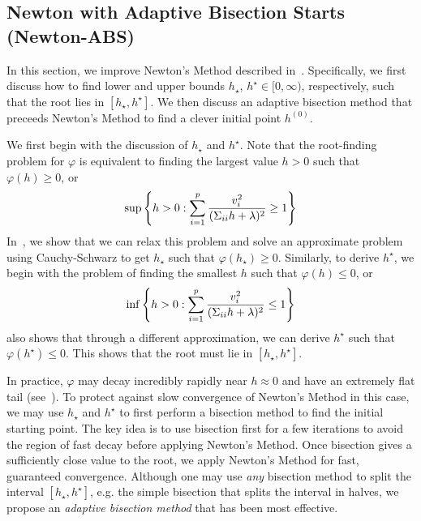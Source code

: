 \subsection{Newton with Adaptive Bisection Starts (Newton-ABS)}\label{ssec:newton-abs}

In this section, we improve Newton's Method described in~.
Specifically, we first discuss how to find lower and upper bounds $h_\star$, $h^\star \in [0,\infty)$,
respectively, such that the root lies in $[h_\star, h^\star]$.
We then discuss an adaptive bisection method that preceeds Newton's Method
to find a clever initial point $h^{(0)}$.

We first begin with the discussion of $h_\star$ and $h^\star$.
Note that the root-finding problem for $\varphi$
is equivalent to finding the largest value $h > 0$ such that $\varphi(h) \geq 0$, or
\begin{align}
    \sup\left\{
        h > 0 :
        \sum\limits_{i=1}^p
        \frac{v_i^2}{(\Sigma_{ii} h + \lambda)^2}
        \geq
        1
    \right\}
    \label{eq:newton-abs:lower-bound-problem}
\end{align}
In~, we show that we can relax this problem
and solve an approximate problem using Cauchy-Schwarz
to get $h_\star$ such that $\varphi(h_\star) \geq 0$.
Similarly, to derive $h^\star$, we begin with the problem of finding the smallest $h$ such that
$\varphi(h) \leq 0$, or
\begin{align}
    \inf\left\{
        h > 0
        :
        \sum\limits_{i=1}^p
        \frac{v_i^2}{(\Sigma_{ii} h + \lambda)^2}
        \leq
        1
    \right\}
    \label{eq:newton-abs:upper-bound-problem}
\end{align}
 also shows that through a different approximation,
we can derive $h^\star$ such that $\varphi(h^\star) \leq 0$.
This shows that the root must lie in $[h_\star, h^\star]$.

In practice, $\varphi$ may decay incredibly rapidly near $h \approx 0$ and have an extremely flat tail
(see~).
To protect against slow convergence of Newton's Method in this case,
we may use $h_\star$ and $h^\star$ to first perform a bisection method to find the initial starting point.
The key idea is to use bisection first for a few iterations 
to avoid the region of fast decay before applying Newton's Method.
Once bisection gives a sufficiently close value to the root, 
we apply Newton's Method for fast, guaranteed convergence.
Although one may use \emph{any} bisection method to split the interval $[h_\star, h^\star]$,
e.g. the simple bisection that splits the interval in halves,
we propose an \emph{adaptive bisection method} that has been most effective.

